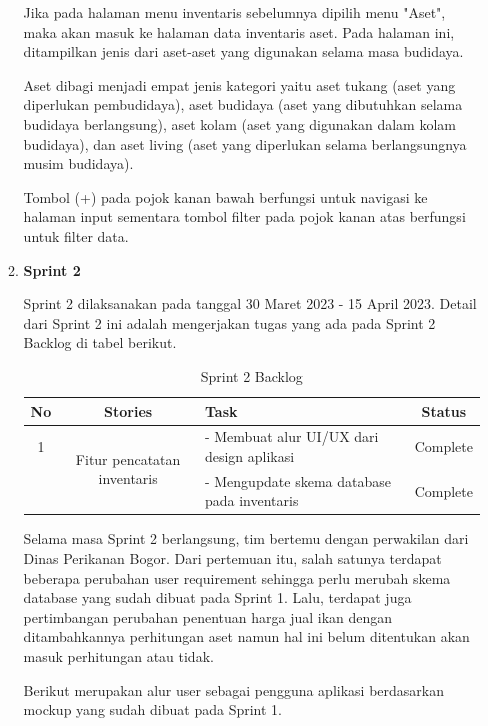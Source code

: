 \begin{enumerate}
\begin{enumerate}
		Jika pada halaman menu inventaris sebelumnya dipilih menu "Aset", maka akan masuk ke halaman data inventaris aset. Pada halaman ini, ditampilkan jenis dari aset-aset yang digunakan selama masa budidaya.
		
		Aset dibagi menjadi empat jenis kategori yaitu aset tukang (aset yang diperlukan pembudidaya), aset budidaya (aset yang dibutuhkan selama budidaya berlangsung), aset kolam (aset yang digunakan dalam kolam budidaya), dan aset living (aset yang diperlukan selama berlangsungnya musim budidaya).

		Tombol (+) pada pojok kanan bawah berfungsi untuk navigasi ke halaman input sementara tombol filter pada pojok kanan atas berfungsi untuk filter data.

		\item \textbf{Sprint 2}
		
		Sprint 2 dilaksanakan pada tanggal 30 Maret 2023 - 15 April 2023. Detail dari Sprint 2 ini adalah mengerjakan tugas yang ada pada Sprint 2 Backlog di tabel berikut.
		
		\begin{table}[H]	
			\begin{center}
				\caption{Sprint 2 Backlog}
				\label{tab:table7}
				\begin{tabular}{|c|c|m{13em}|c|}
				\hline
				\textbf{No} & \textbf{Stories} & \textbf{Task} & \textbf{Status} \\
				\hline
				1 & \multirow{2}{10em}{Fitur pencatatan inventaris} & - Membuat alur UI/UX dari design aplikasi & Complete \\
				&  & - Mengupdate skema database pada inventaris & Complete \\ 
				\hline
				\end{tabular}
			\end{center}
		\end{table}

		Selama masa Sprint 2 berlangsung, tim bertemu dengan perwakilan dari Dinas Perikanan Bogor. Dari pertemuan itu, salah satunya terdapat beberapa perubahan user requirement sehingga perlu merubah skema database yang sudah dibuat pada Sprint 1. Lalu, terdapat juga pertimbangan perubahan penentuan harga jual ikan dengan ditambahkannya perhitungan aset namun hal ini belum ditentukan akan masuk perhitungan atau tidak. 

		Berikut merupakan alur user sebagai pengguna aplikasi berdasarkan mockup yang sudah dibuat pada Sprint 1.


\end{enumerate}
\end{enumerate}
